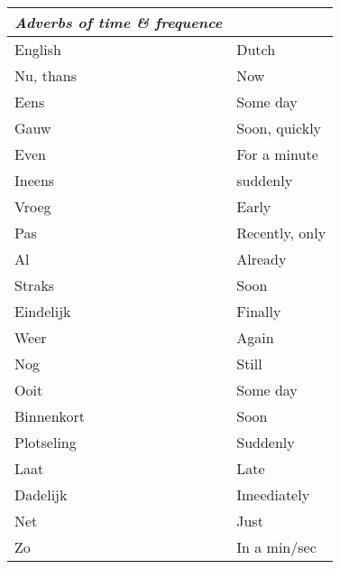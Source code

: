 \documentclass[letterpaper,11pt]{article}
\begin{document}
\begin{tabular}[t]{|l | l|}
    \hline
    \textit{Adverbs of time \& frequence} &         \\
    \hline
    English            & Dutch   \\
    \hline
    Nu, thans & Now \\
    Eens & Some day \\
    Gauw & Soon, quickly \\
    Even & For a minute \\
    Ineens & suddenly \\
    Vroeg & Early \\
    Pas & Recently, only \\
    Al & Already \\
    Straks & Soon \\ 
    Eindelijk & Finally \\
    Weer & Again \\
    Nog & Still \\
    Ooit & Some day \\
    Binnenkort & Soon \\
    Plotseling & Suddenly \\
    Laat & Late \\
    Dadelijk &  Imeediately \\
    Net & Just \\
    Zo & In a min/sec \\
    \hline
\end{tabular}
\end{document}
